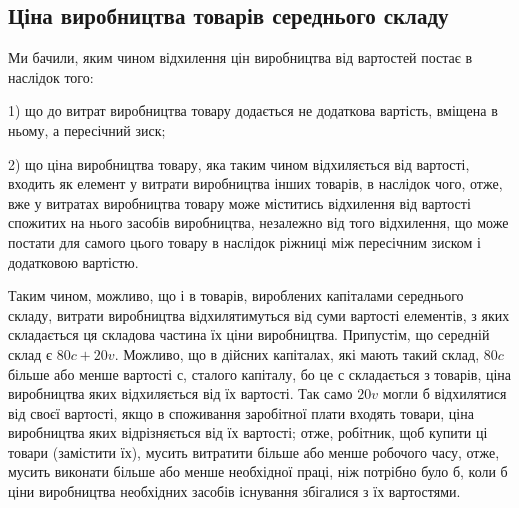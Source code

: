 \subsection{Ціна виробництва товарів середнього складу}

Ми бачили, яким чином відхилення цін виробництва від вартостей постає в наслідок того:

1) що до витрат виробництва товару додається не додаткова вартість, вміщена в ньому, а
пересічний зиск;

2) що ціна виробництва товару, яка таким чином відхиляється від вартості, входить як елемент
у витрати виробництва інших товарів, в наслідок чого, отже, вже у витратах виробництва товару може
міститись відхилення від вартості спожитих на нього засобів виробництва, незалежно від того
відхилення, що може постати для самого цього товару в наслідок ріжниці між пересічним зиском і
додатковою вартістю.

Таким чином, можливо, що і в товарів, вироблених капіталами середнього складу, витрати виробництва
відхилятимуться від суми вартості елементів, з яких складається ця складова частина їх ціни
виробництва. Припустім, що середній склад є $80 c + 20 v$. Можливо, що в дійсних капіталах, які мають
такий склад, $80  c$ більше або менше вартості $с$, сталого капіталу, бо це $с$ складається з товарів,
ціна виробництва яких відхиляється від їх вартості. Так само $20 v$  могли б відхилятися від своєї
вартості, якщо в споживання заробітної плати входять товари, ціна виробництва яких відрізняється від
їх вартості; отже, робітник, щоб купити ці товари (замістити їх), мусить витратити більше або менше
робочого часу, отже, мусить виконати більше або менше необхідної праці, ніж потрібно було б, коли б
ціни виробництва
необхідних засобів існування збігалися з їх вартостями.

